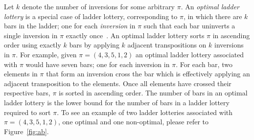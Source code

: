 Let $k$ denote the number of inversions for some arbitrary $\pi$.
An \emph{optimal ladder lottery} is a special case of ladder 
lottery, corresponding to $\pi$, in which there are $k$ bars in the ladder; one for each \emph{inversion} in $\pi$ such that each 
bar uninverts a single inversion in $\pi$ exactly once~\cite{A1}.
An optimal ladder lottery sorts $\pi$ in ascending order using exactly $k$ bars by applying 
$k$ adjacent transpositions on $k$ inversions in $\pi$.
For example, given $\pi=(4,3,5,1,2)$ an optimal ladder lottery associated with $\pi$ would have 
seven bars; one for each inversion in $\pi$. For each bar, two elements in $\pi$ that form 
an inversion cross the bar which is effectively applying an adjacent transposition to the elements. 
Once all elements have crossed their respective bars, $\pi$ is sorted in ascending order. The number of bars in an optimal ladder lottery 
is the lower bound for the number of bars in a ladder lottery required to sort $\pi$. 
To see an example of two ladder lotteries associated with 
$\pi=(4,3,5,1,2)$, one optimal and one non-optimal, please refer to Figure~\ref{fig:ab}.
